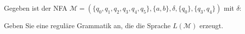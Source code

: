 
\begin{exercise}
  Gegeben ist der NFA
  $\mathcal{M}=(\{q_0,q_1,q_2,q_3,q_4,q_5\},\{a,b\},\delta ,\{q_0\}, \{q_3,q_4\})$ mit $\delta$:
  \begin{center}
  
  \end{center}
  Geben Sie eine reguläre Grammatik an, die die Sprache $L(\mathcal{M})$ erzeugt.
\end{exercise}
